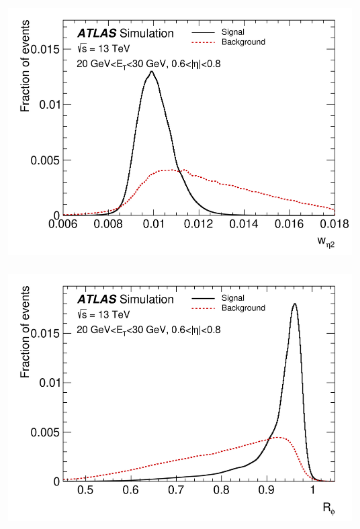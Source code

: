 \begin{figure}[h]
\centering
  \begin{subfigure}[b]{0.495\textwidth}
    \centering
    \includegraphics[width=1.0\textwidth]{figs/egamma/w_eta2.png} 
    \label{fig:egamma:weta2}
  \end{subfigure}
  \hfill
  \begin{subfigure}[b]{0.495\textwidth}
    \centering
    \includegraphics[width=1.0\textwidth]{figs/egamma/R_phi.png} 
    \label{fig:egamma:Rphi}
  \end{subfigure}
  \hfill
  \begin{subfigure}[b]{0.495\textwidth}
    \centering

\end{subfigure}
\end{figure}
